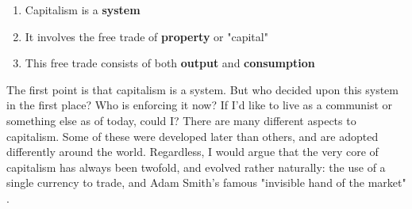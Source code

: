 \documentclass[12pt]{memoir}
\begin{document}
				\begin{enumerate}
					\item Capitalism is a \textbf{system}
					\item It involves the free trade of \textbf{property} or "capital"
					\item This free trade consists of both \textbf{output} and \textbf{consumption}
				\end{enumerate}
			
			The first point is that capitalism is a system. But who decided upon this system in the first place? Who is enforcing it now? If I'd like to live as a communist or something 
			else as of today, could I? There are many different aspects to capitalism. Some of these were developed later than others, and are adopted differently around 
			the world. Regardless, I would argue that the very core of capitalism has always been twofold, and evolved rather naturally: the use of a single currency to trade, and Adam Smith's famous 
			"invisible hand of the market" \cite{Smith1776}.\
			
\end{document}
